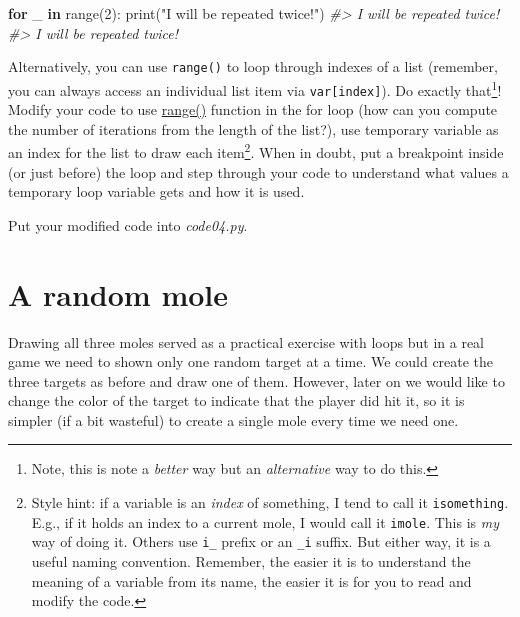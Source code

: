\documentclass[
]{book}
\newenvironment{Shaded}{\begin{snugshade}}{\end{snugshade}}
\newcommand{\BuiltInTok}[1]{#1}
\newcommand{\CommentTok}[1]{\textcolor[rgb]{0.56,0.35,0.01}{\textit{#1}}}
\newcommand{\ControlFlowTok}[1]{\textcolor[rgb]{0.13,0.29,0.53}{\textbf{#1}}}
\newcommand{\DecValTok}[1]{\textcolor[rgb]{0.00,0.00,0.81}{#1}}
\newcommand{\KeywordTok}[1]{\textcolor[rgb]{0.13,0.29,0.53}{\textbf{#1}}}
\newcommand{\NormalTok}[1]{#1}
\newcommand{\StringTok}[1]{\textcolor[rgb]{0.31,0.60,0.02}{#1}}
\begin{document}
\begin{Shaded}
\begin{Highlighting}[]
\ControlFlowTok{for}\NormalTok{ \_ }\KeywordTok{in} \BuiltInTok{range}\NormalTok{(}\DecValTok{2}\NormalTok{):}
    \BuiltInTok{print}\NormalTok{(}\StringTok{"I will be repeated twice!"}\NormalTok{)}
\CommentTok{\#\textgreater{} I will be repeated twice!}
\CommentTok{\#\textgreater{} I will be repeated twice!}
\end{Highlighting}
\end{Shaded}

Alternatively, you can use \texttt{range()} to loop through indexes of a list (remember, you can always access an individual list item via \texttt{var{[}index{]}}). Do exactly that\footnote{Note, this is note a \emph{better} way but an \emph{alternative} way to do this.}! Modify your code to use \href{(https://docs.python.org/3/library/stdtypes.html\#range)}{range()} function in the for loop (how can you compute the number of iterations from the length of the list?), use temporary variable as an index for the list to draw each item\footnote{Style hint: if a variable is an \emph{index} of something, I tend to call it \texttt{isomething}. E.g., if it holds an index to a current mole, I would call it \texttt{imole}. This is \emph{my} way of doing it. Others use \texttt{i\_} prefix or an \texttt{\_i} suffix. But either way, it is a useful naming convention. Remember, the easier it is to understand the meaning of a variable from its name, the easier it is for you to read and modify the code.}. When in doubt, put a breakpoint inside (or just before) the loop and step through your code to understand what values a temporary loop variable gets and how it is used.

Put your modified code into \emph{code04.py}.

\hypertarget{random-mole}{%
\section{A random mole}\label{random-mole}}

Drawing all three moles served as a practical exercise with loops but in a real game we need to shown only one random target at a time. We could create the three targets as before and draw one of them. However, later on we would like to change the color of the target to indicate that the player did hit it, so it is simpler (if a bit wasteful) to create a single mole every time we need one.
\end{document}

